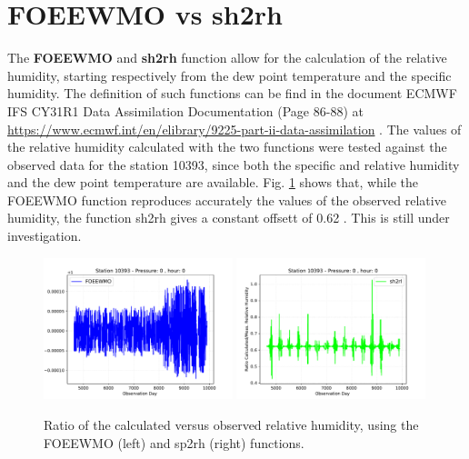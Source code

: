 \documentclass[a4paper,11pt]{article}
\begin{document}
\section{FOEEWMO vs sh2rh} \label{comparison}
The \textbf{FOEEWMO} and \textbf{sh2rh} function allow for the calculation of the relative humidity, starting respectively from the dew point temperature and the specific humidity. The definition of such functions can be find in the document ECMWF IFS CY31R1 Data Assimilation Documentation (Page 86-88) at \url{https://www.ecmwf.int/en/elibrary/9225-part-ii-data-assimilation} .
The values of the relative humidity calculated with the two functions were tested against the observed data for the station 10393, since both the specific and relative humidity and the dew point temperature are available. Fig. \ref{ratio} shows that, while the FOEEWMO function reproduces accurately the values of the observed relative humidity, the function sh2rh gives a constant offsett of 0.62 . This is still under investigation.


\begin{figure}[!b]
	\centering
	\subfigure
	{ \includegraphics[width=0.49\textwidth]{Fig/ratios_FOEEWMO_0_0.pdf}}
	\subfigure
	{\includegraphics[width=0.49\textwidth]{Fig/ratios_sh2rl_0_0.pdf}}
	\caption{Ratio of the calculated versus observed relative humidity, using the FOEEWMO (left) and sp2rh (right) functions.}
	\label{ratio}
\end{figure}
	
\end{document}

